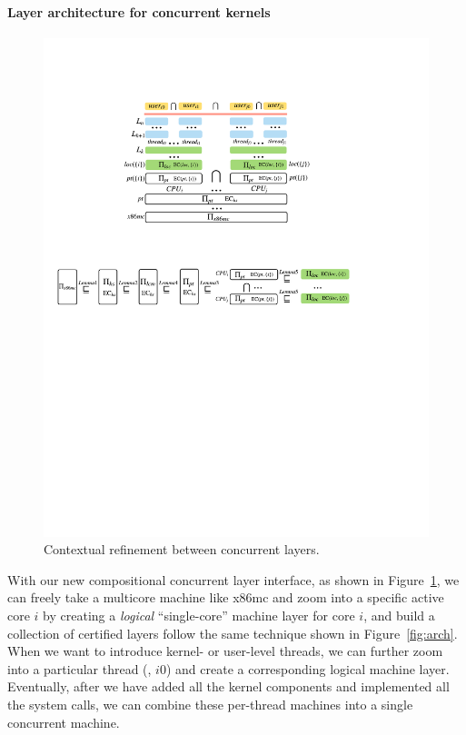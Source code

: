 \paragraph{Layer architecture for concurrent kernels}

\begin{figure}[t]\centering
\includegraphics[scale=1]{figs/refine_layer}
\caption{Contextual refinement between concurrent layers.}
\label{fig:spec:refine_layer}
\hrulefill
\end{figure}

With our new compositional concurrent layer interface, as shown in
Figure~\ref{fig:spec:refine_layer}, we can freely take a multicore
machine like x86mc and zoom into a specific active core $i$ by
creating a {\em logical} ``single-core'' machine layer for core $i$,
and build
a collection of certified layers
follow the same technique shown in Figure~\ref{fig:arch}. 
When we want to introduce kernel- or
user-level threads, we can further zoom into a particular thread
(\eg, $i0$) and create a corresponding logical machine
layer. Eventually, after we have added all the kernel components and
implemented all the system calls, we can combine these per-thread
machines into a single concurrent machine.

